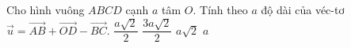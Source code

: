 \begin{ex}%
	Cho hình vuông $ABCD$ cạnh $a$ tâm $O$. Tính theo $a$ độ dài của véc-tơ\break $\overrightarrow{u}=\overrightarrow{AB}+\overrightarrow{OD} -\overrightarrow{BC}$.
		\choice
		{\True $\dfrac{a\sqrt{2}}{2}$}
		{$\dfrac{3a\sqrt{2}}{2}$}
		{$a\sqrt{2}$}
		{$a$}
\end{ex}
